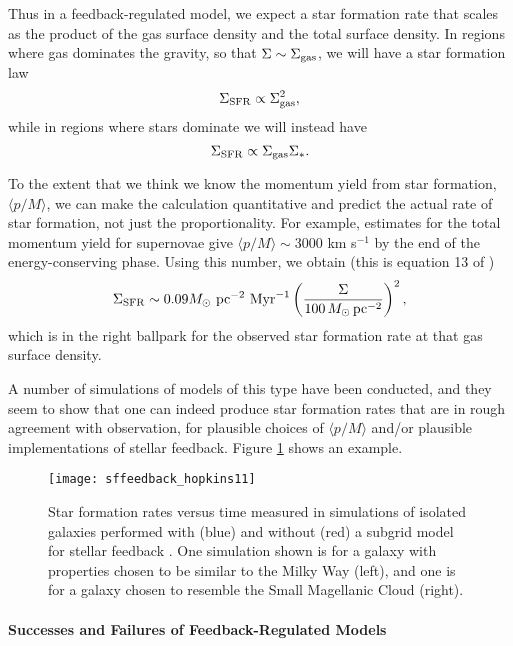 Thus in a feedback-regulated model, we expect a star formation rate that scales as the product of the gas surface density and the total surface density. In regions where gas dominates the gravity, so that $\Sigma \sim \Sigma_{\rm gas}$, we will have a star formation law
\begin{equation}
\Sigma_{\rm SFR} \propto \Sigma_{\rm gas}^2,
\end{equation}
while in regions where stars dominate we will instead have
\begin{equation}
\Sigma_{\rm SFR} \propto \Sigma_{\rm gas} \Sigma_*.
\end{equation}

To the extent that we think we know the momentum yield from star formation, $\langle p/M\rangle$, we can make the calculation quantitative and predict the actual rate of star formation, not just the proportionality. For example, estimates for the total momentum yield for supernovae give $\langle p/M\rangle \sim 3000$ km s$^{-1}$ by the end of the energy-conserving phase. Using this number, we obtain (this is equation 13 of \citealt{ostriker11a})
\begin{equation}
\Sigma_{\rm SFR} \sim 0.09 M_\odot\mbox{ pc}^{-2}\mbox{ Myr}^{-1} \left(\frac{\Sigma}{100\,M_\odot\,\mathrm{pc}^{-2}}\right)^2,
\end{equation}
which is in the right ballpark for the observed star formation rate at that gas surface density.

A number of simulations of models of this type have been conducted, and they seem to show that one can indeed produce star formation rates that are in rough agreement with observation, for plausible choices of $\langle p/M\rangle$ and/or plausible implementations of stellar feedback. Figure \ref{fig:sffeedback_hopkins11} shows an example.

\begin{figure}
\texttt{[image: sffeedback\_hopkins11]}
\caption[Star formation rates in galaxy simulations with and without stellar feedback]{
\label{fig:sffeedback_hopkins11}
Star formation rates versus time measured in simulations of isolated galaxies performed with (blue) and without (red) a subgrid model for stellar feedback \citet{hopkins11a}. One simulation shown is for a galaxy with properties chosen to be similar to the Milky Way (left), and one is for a galaxy chosen to resemble the Small Magellanic Cloud (right).
}
\end{figure}

\paragraph{Successes and Failures of Feedback-Regulated Models}

